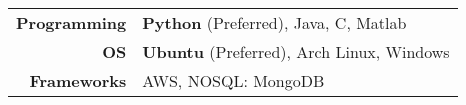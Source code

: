 
\tabcolsep=0.11cm
\begin{tabular}{rl}
  \textbf{Programming} & {\bf Python} (Preferred), Java, C, Matlab \\
  \textbf{OS} & {\bf Ubuntu} (Preferred), Arch Linux, Windows \\
  \textbf{Frameworks} & AWS, NOSQL: MongoDB\\
\end{tabular}


